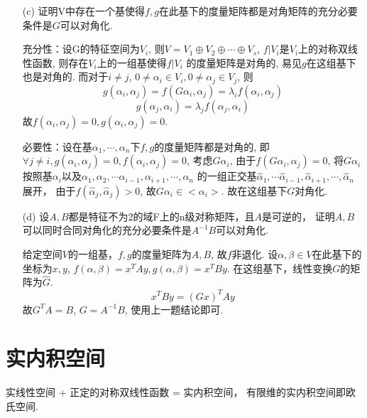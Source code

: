 \begin{itemize}
\begin{itemize}
        \item [(c)] 证明V中存在一个基使得$f,g$在此基下的度量矩阵都是对角矩阵的充分必要条件是$G$可以对角化.
        
        \begin{solution}
            充分性：设G的特征空间为$V_i$, 则$V = V_1 \oplus V_2 \oplus \cdots \oplus V_s$,
            $f|V_{i}$是$V_i$上的对称双线性函数, 则存在$V_i$上的一组基使得$f|V_i$
            的度量矩阵是对角的, 易见$g$在这组基下也是对角的. 而对于$i\ne j$, $0 \ne \alpha_i \in V_i, 0 \ne \alpha_j \in V_j$,
            则
            $$g(\alpha_i, \alpha_j) = f(G\alpha_i, \alpha_j) = \lambda_i f(\alpha_i, \alpha_j)$$
            $$g(\alpha_j, \alpha_i) = \lambda_j f(\alpha_j, \alpha_i) $$
            故$f(\alpha_i, \alpha_j) = 0, g(\alpha_i, \alpha_j) = 0$.

            必要性：设在基$\alpha_1, \cdots, \alpha_n$下$f,g$的度量矩阵都是对角的,
            即$\forall j \ne i, g(\alpha_i, \alpha_j) = 0, f(\alpha_i, \alpha_j) = 0$,
            考虑$G \alpha_i$, 由于$f(G\alpha_i, \alpha_j) = 0$, 
            将$G \alpha_i$按照基$\alpha_i$以及$\alpha_1, \alpha_2,
            \cdots \alpha_{i-1}, \alpha_{i+1}, \cdots, \alpha_n$
            的一组正交基$\hat \alpha_1,
            \cdots \hat \alpha_{i-1}, \hat \alpha_{i+1}, \cdots, 
            \hat \alpha_n$展开，
            由于$f(\hat \alpha_j, \hat \alpha_j) > 0$, 故$G\alpha_i \in <\alpha_i>.$
            故在这组基下$G$对角化.
        \end{solution}

        \item [(d)] 设$A,B$都是特征不为2的域F上的n级对称矩阵，且$A$是可逆的，
        证明$A,B$可以同时合同对角化的充分必要条件是$A^{-1}B$可以对角化.
        
        \begin{solution}
            给定空间$V$的一组基，$f,g$的度量矩阵为$A,B$, 故$f$非退化.
            设$\alpha, \beta \in V$在此基下的坐标为$x,y$,
            $f(\alpha, \beta) = x^T A y, g(\alpha, \beta) = x^T By$.
            在这组基下，线性变换$G$的矩阵为$\hat G$.
            $$x^T B y = (Gx)^T A y$$
            故$G^TA = B$, $G = A^{-1}B$, 使用上一题结论即可.
        \end{solution}
    \end{itemize} 
\end{itemize}

\section{实内积空间}
实线性空间 + 正定的对称双线性函数 = 实内积空间，
有限维的实内积空间即欧氏空间.


